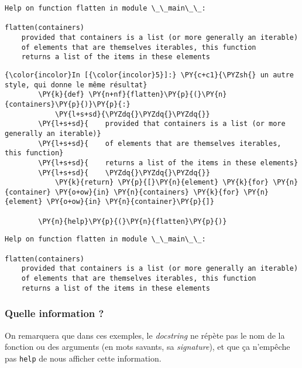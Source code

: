     \begin{Verbatim}[commandchars=\\\{\},frame=single,framerule=0.3mm,rulecolor=\color{cellframecolor}]
Help on function flatten in module \_\_main\_\_:

flatten(containers)
    provided that containers is a list (or more generally an iterable)
    of elements that are themselves iterables, this function
    returns a list of the items in these elements
\end{Verbatim}

    \begin{Verbatim}[commandchars=\\\{\},frame=single,framerule=0.3mm,rulecolor=\color{cellframecolor}]
{\color{incolor}In [{\color{incolor}5}]:} \PY{c+c1}{\PYZsh{} un autre style, qui donne le même résultat}
        \PY{k}{def} \PY{n+nf}{flatten}\PY{p}{(}\PY{n}{containers}\PY{p}{)}\PY{p}{:}
            \PY{l+s+sd}{\PYZdq{}\PYZdq{}\PYZdq{}}
        \PY{l+s+sd}{    provided that containers is a list (or more generally an iterable)}
        \PY{l+s+sd}{    of elements that are themselves iterables, this function}
        \PY{l+s+sd}{    returns a list of the items in these elements}
        \PY{l+s+sd}{    \PYZdq{}\PYZdq{}\PYZdq{}}
            \PY{k}{return} \PY{p}{[}\PY{n}{element} \PY{k}{for} \PY{n}{container} \PY{o+ow}{in} \PY{n}{containers} \PY{k}{for} \PY{n}{element} \PY{o+ow}{in} \PY{n}{container}\PY{p}{]}
        
        \PY{n}{help}\PY{p}{(}\PY{n}{flatten}\PY{p}{)}
\end{Verbatim}


    \begin{Verbatim}[commandchars=\\\{\},frame=single,framerule=0.3mm,rulecolor=\color{cellframecolor}]
Help on function flatten in module \_\_main\_\_:

flatten(containers)
    provided that containers is a list (or more generally an iterable)
    of elements that are themselves iterables, this function
    returns a list of the items in these elements
\end{Verbatim}

    \hypertarget{quelle-information}{%
\subsubsection{Quelle information ?}\label{quelle-information}}

    On remarquera que dans ces exemples, le \emph{docstring} ne répète pas
le nom de la fonction ou des arguments (en mots savants, sa
\emph{signature}), et que ça n'empêche pas \texttt{help} de nous
afficher cette information.


